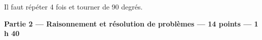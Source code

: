 %
Il faut répéter 4 fois et tourner de 90 degrés.

\begin{center}
\textbf{Partie 2 — Raisonnement et résolution de problèmes — 14 points — 1 h 40}
\end{center}

\medskip


\bigskip
